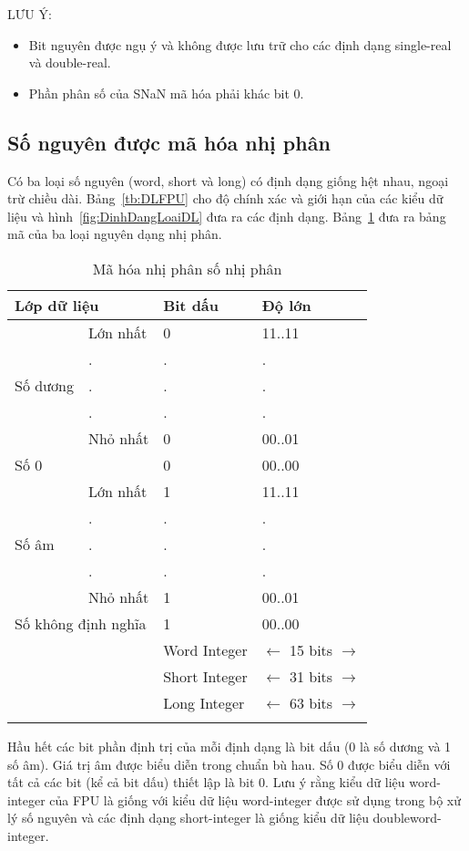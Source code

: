 \newpage
	LƯU Ý:
	\begin{itemize}
		\item[1] Bit nguyên được ngụ ý và không được lưu trữ cho các định dạng single-real và double-real.
		 \item[2] Phần phân số của SNaN mã hóa phải khác bit 0.
	\end{itemize}

		\subsection*{ Số nguyên được mã hóa nhị phân}
	Có ba loại số nguyên (word, short và long) có định dạng giống hệt nhau, ngoại trừ chiều dài. Bảng~\ref{tb:DLFPU} cho độ chính xác và giới hạn của các kiểu dữ liệu và hình~\ref{fig:DinhDangLoaiDL} đưa ra các định dạng. Bảng~\ref{tb:MaHoaNhiPhan} đưa ra bảng mã của ba loại nguyên dạng nhị phân.
		\begin{longtable}{|l|l|l|l|}
			\hline
				\multicolumn{2}{|l|}{Lớp dữ liệu} & Bit dấu & Độ lớn \\
			\hline
			\hline
					 & Lớn nhất & 0 & 11..11 \\				
					& . & . &. \\
					Số dương& . & . &. \\
					& . & . &. \\
					 & Nhỏ nhất & 0 & 00..01 \\				
			\hline
				\multicolumn{2}{|l|}{Số 0} & 0 &00..00 \\
			\hline
					 & Lớn nhất & 1 & 11..11 \\				
					& . & . &. \\
					Số âm & . & . &. \\
					& . & . &. \\
					 & Nhỏ nhất & 1 & 00..01 \\	
			\hline
				\multicolumn{2}{|l|}{Số không định nghĩa} & 1 &00..00 \\
			\hline
				\multicolumn{2}{l}{} & Word Integer & $\leftarrow$ 15 bits $\to $ \\
				\multicolumn{2}{l}{} & Short Integer & $\leftarrow$ 31 bits $\to $ \\
				\multicolumn{2}{l}{} & Long Integer & $\leftarrow$ 63 bits $\to $ \\
				\caption{Mã hóa nhị phân số nhị phân}
				\label{tb:MaHoaNhiPhan}
		\end{longtable}	

	\newpage
	Hầu hết các bit phần định trị của mỗi định dạng là bit dấu (0 là số dương và 1 số âm). Giá trị âm được biểu diễn trong chuẩn bù hau. Số 0 được biểu diễn với tất cả các bit (kể cả bit dấu) thiết lập là bit 0. Lưu ý rằng kiểu dữ liệu word-integer của FPU là giống với kiểu dữ liệu word-integer được sử dụng trong bộ xử lý số nguyên và các định dạng short-integer là giống kiểu dữ liệu doubleword-integer.\\
	
